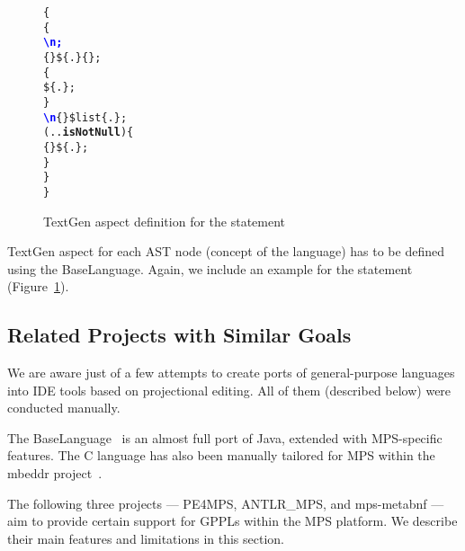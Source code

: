 \begin{figure}[ht]
\vspace{-2mm}
\centering
\begin{alltt}
\small
{}  \{
   \{
     \textcolor{blue}{\textbf{\textbackslash{}n;}}
     \{\} \$\{.\} \{\mpstgliteral{) \{}\};
     \{
       \$\{.\};
    \}
     \textcolor{blue}{\textbf{\textbackslash{}n}} \{\mpstgliteral{\}}\} \$list\{.\};
     (..\textbf{isNotNull}) \{
       \{ \} \$\{.\};
    \}
  \}
\}
\end{alltt}
\vspace{-1mm}
\caption{TextGen aspect definition for the  statement}
\label{fig:if_statement_textgen}
\vspace{-2mm}
\end{figure}

TextGen aspect for each AST node (concept of the language) has to be defined using the BaseLanguage.
Again, we include an example for the  statement (Figure~\ref{fig:if_statement_textgen}).

\subsection{Related Projects with Similar Goals}
\label{sect:RELATED}

We are aware just of a few attempts to create ports of general-purpose languages into IDE tools based on projectional editing.
All of them (described below) were conducted manually.

The BaseLanguage~\cite{ref:BASELANG} is an almost full port of Java, extended with MPS-specific features.
The C language has also been manually tailored for MPS within the mbeddr project~\cite{ref:MBEDDR}.

The following three projects --- PE4MPS, ANTLR{\_}MPS, and mps-metabnf --- aim to provide certain support for GPPLs within the MPS platform.
We describe their main features and limitations in this section.


